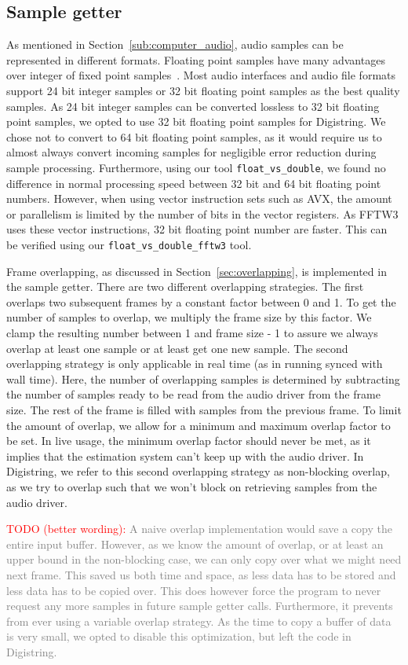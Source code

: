 \documentclass[10pt,twocolumn]{article}
\begin{document}
\subsection{Sample getter}
As mentioned in Section~\ref{sub:computer_audio}, audio samples can be represented in different formats. Floating point samples have many advantages over integer of fixed point samples~\cite{dspfloat}. Most audio interfaces and audio file formats support 24 bit integer samples or 32 bit floating point samples as the best quality samples. As 24 bit integer samples can be converted lossless to 32 bit floating point samples, we opted to use 32 bit floating point samples for Digistring. We chose not to convert to 64 bit floating point samples, as it would require us to almost always convert incoming samples for negligible error reduction during sample processing. Furthermore, using our tool \texttt{float\_vs\_double}, we found no difference in normal processing speed between 32 bit and 64 bit floating point numbers. However, when using vector instruction sets such as AVX, the amount or parallelism is limited by the number of bits in the vector registers. As FFTW3 uses these vector instructions, 32 bit floating point number are faster. This can be verified using our \texttt{float\_vs\_double\_fftw3} tool.

Frame overlapping, as discussed in Section~\ref{sec:overlapping}, is implemented in the sample getter. There are two different overlapping strategies. The first overlaps two subsequent frames by a constant factor between 0 and 1. To get the number of samples to overlap, we multiply the frame size by this factor. We clamp the resulting number between 1 and frame size - 1 to assure we always overlap at least one sample or at least get one new sample. The second overlapping strategy is only applicable in real time (as in running synced with wall time). Here, the number of overlapping samples is determined by subtracting the number of samples ready to be read from the audio driver from the frame size. The rest of the frame is filled with samples from the previous frame. To limit the amount of overlap, we allow for a minimum and maximum overlap factor to be set. In live usage, the minimum overlap factor should never be met, as it implies that the estimation system can't keep up with the audio driver. In Digistring, we refer to this second overlapping strategy as non-blocking overlap, as we try to overlap such that we won't block on retrieving samples from the audio driver.

\textcolor{red}{TODO (better wording):} \textcolor{gray}{A naive overlap implementation would save a copy the entire input buffer. However, as we know the amount of overlap, or at least an upper bound in the non-blocking case, we can only copy over what we might need next frame. This saved us both time and space, as less data has to be stored and less data has to be copied over. This does however force the program to never request any more samples in future sample getter calls. Furthermore, it prevents from ever using a variable overlap strategy. As the time to copy a buffer of data is very small, we opted to disable this optimization, but left the code in Digistring.}
\end{document}
